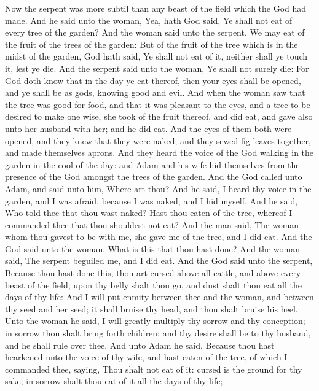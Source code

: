 \begin{biblechapter} %
\verse Now the serpent was more subtil than any beast of the field which the \LORD God had made. And he said unto the woman, Yea, hath God said, Ye shall not eat of every tree of the garden?
\verse And the woman said unto the serpent, We may eat of the fruit of the trees of the garden:
\verse But of the fruit of the tree which is in the midst of the garden, God hath said, Ye shall not eat of it, neither shall ye touch it, lest ye die.
\verse And the serpent said unto the woman, Ye shall not surely die:
\verse For God doth know that in the day ye eat thereof, then your eyes shall be opened, and ye shall be as gods, knowing good and evil.
\verse And when the woman saw that the tree was good for food, and that it was pleasant to the eyes, and a tree to be desired to make one wise, she took of the fruit thereof, and did eat, and gave also unto her husband with her; and he did eat.
\verse And the eyes of them both were opened, and they knew that they were naked; and they sewed fig leaves together, and made themselves aprons.
\verse And they heard the voice of the \LORD God walking in the garden in the cool of the day: and Adam and his wife hid themselves from the presence of the \LORD God amongst the trees of the garden.
\verse And the \LORD God called unto Adam, and said unto him, Where art thou?
\verse And he said, I heard thy voice in the garden, and I was afraid, because I was naked; and I hid myself.
\verse And he said, Who told thee that thou wast naked? Hast thou eaten of the tree, whereof I commanded thee that thou shouldest not eat?
\verse And the man said, The woman whom thou gavest to be with me, she gave me of the tree, and I did eat.
\verse And the \LORD God said unto the woman, What is this that thou hast done? And the woman said, The serpent beguiled me, and I did eat.
\verse And the \LORD God said unto the serpent, Because thou hast done this, thou art cursed above all cattle, and above every beast of the field; upon thy belly shalt thou go, and dust shalt thou eat all the days of thy life:
\verse And I will put enmity between thee and the woman, and between thy seed and her seed; it shall bruise thy head, and thou shalt bruise his heel.
\verse Unto the woman he said, I will greatly multiply thy sorrow and thy conception; in sorrow thou shalt bring forth children; and thy desire shall be to thy husband, and he shall rule over thee.
\verse And unto Adam he said, Because thou hast hearkened unto the voice of thy wife, and hast eaten of the tree, of which I commanded thee, saying, Thou shalt not eat of it: cursed is the ground for thy sake; in sorrow shalt thou eat of it all the days of thy life;

\end{biblechapter}
